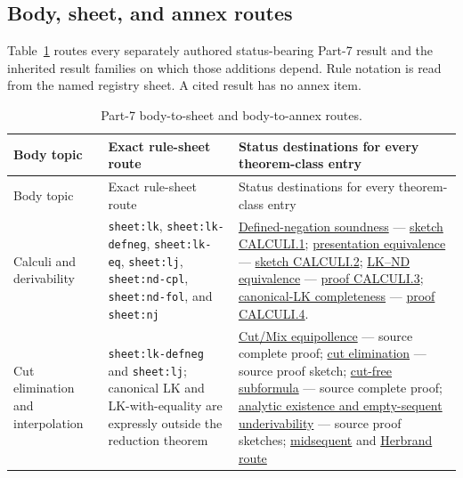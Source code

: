\begingroup
\pagestyle{plain}
\begin{landscape}
\thispagestyle{plain}
\section{Body, sheet, and annex routes}
\label{sec:p07-navigation}

Table~\ref{tab:p07-body-annex-routes} routes every separately authored
status-bearing Part-7 result and the inherited result families on which those
additions depend.  Rule notation is read from the named registry sheet.  A
cited result has no annex item.

\begingroup\scriptsize
\setlength{\tabcolsep}{3pt}
\begin{longtable}{@{}p{.82in}p{2.05in}p{4.95in}@{}}
\caption{Part-7 body-to-sheet and body-to-annex routes.}
\label{tab:p07-body-annex-routes}\\
\toprule
Body topic & Exact rule-sheet route & Status destinations for every theorem-class entry \\
\midrule
\endfirsthead
\toprule
Body topic & Exact rule-sheet route & Status destinations for every theorem-class entry \\
\midrule
\endhead
Calculi and derivability &
\texttt{sheet:lk}, \texttt{sheet:lk-defneg}, \texttt{sheet:lk-eq},
\texttt{sheet:lj}, \texttt{sheet:nd-cpl}, \texttt{sheet:nd-fol}, and
\texttt{sheet:nj} &
\hyperref[thm:p07-lkd-soundness]{Defined-negation soundness}
--- \hyperref[annex:p7.calculi.1]{sketch CALCULI.1};
\hyperref[thm:p07-lk-presentation-equivalence]{presentation equivalence}
--- \hyperref[annex:p7.calculi.2]{sketch CALCULI.2};
\hyperref[thm:p07-lk-nd-equivalence]{LK--ND equivalence}
--- \hyperref[annex:p7.calculi.3]{proof CALCULI.3};
\hyperref[thm:p07-canonical-lk-completeness]{canonical-LK completeness}
--- \hyperref[annex:p7.calculi.4]{proof CALCULI.4}. \\
\addlinespace
Cut elimination and interpolation &
\texttt{sheet:lk-defneg} and \texttt{sheet:lj}; canonical LK and
LK-with-equality are expressly outside the reduction theorem &
\hyperref[lem:cut-mix-equipollence]{Cut/Mix equipollence}
--- source complete proof;
\hyperref[ch:cut-elimination]{cut elimination}
--- source proof sketch;
\hyperref[lem:cutfree-subformula]{cut-free subformula}
--- source complete proof;
\hyperref[sec:cut-elimination-02]{analytic existence and empty-sequent underivability}
--- source proof sketches;
\hyperref[thm:p07-midsequent]{midsequent} and
\hyperref[thm:p07-herbrand-midsequent]{Herbrand route}

\end{longtable}
\end{landscape}
